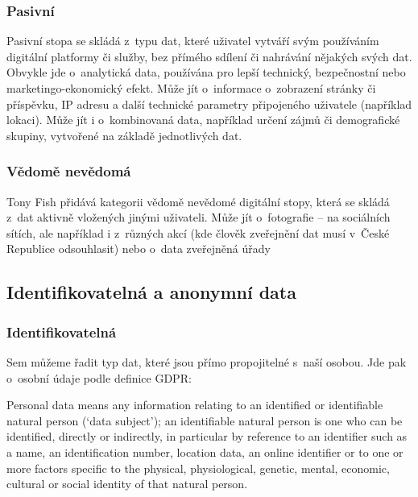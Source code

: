\subsubsection*{Pasivní}

Pasivní stopa se skládá z~typu dat, které uživatel vytváří svým používáním digitální platformy či služby, bez přímého sdílení či nahrávání nějakých svých dat. Obvykle jde o~analytická data, používána pro lepší technický, bezpečnostní nebo marketingo-ekonomický efekt. Může jít o~informace o~zobrazení stránky či příspěvku, IP adresu a další technické parametry připojeného uživatele (například lokaci). Může jít i o~kombinovaná data, například určení zájmů či demografické skupiny, vytvořené na základě jednotlivých dat.

\subsubsection*{Vědomě nevědomá}

Tony Fish přidává kategorii vědomě nevědomé digitální stopy, která se skládá z~dat aktivně vložených jinými uživateli\citep{fish-digital-footprint}.
Může jít o~fotografie -- na sociálních sítích, ale například i z~různých akcí (kde člověk zveřejnění dat musí v~České Republice odsouhlasit) nebo o~data zveřejněná úřady

\subsection{Identifikovatelná a anonymní data}

\subsubsection*{Identifikovatelná}

Sem můžeme řadit typ dat, které jsou přímo propojitelné s~naší osobou. Jde pak o~osobní údaje podle definice GDPR:

\begin{displayquote}
Personal data means any information relating to an identified or identifiable natural person (‘data subject’); an identifiable natural person is one who can be identified, directly or indirectly, in particular by reference to an identifier such as a name, an identification number, location data, an online identifier or to one or more factors specific to the physical, physiological, genetic, mental, economic, cultural or social identity of that natural person.\citep{gdpr}
\end{displayquote}

